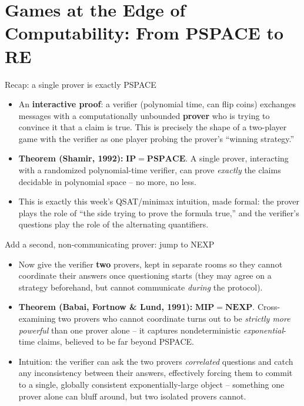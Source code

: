 \documentclass[11pt,aspectratio=169]{beamer}
\begin{document}
\section{Games at the Edge of Computability: From PSPACE to RE}

\begin{frame}{Recap: a single prover is exactly PSPACE}
  \begin{itemize}
    \item An \textbf{interactive proof}: a verifier (polynomial time, can flip coins)
    exchanges messages with a computationally unbounded \textbf{prover} who is trying
    to convince it that a claim is true. This is precisely the shape of a two-player
    game with the verifier as one player probing the prover's ``winning strategy.''
    \item \textbf{Theorem (Shamir, 1992):} $\mathbf{IP} = \mathbf{PSPACE}$. A single
    prover, interacting with a randomized polynomial-time verifier, can prove
    \emph{exactly} the claims decidable in polynomial space -- no more, no less.
    \item This is exactly this week's QSAT/minimax intuition, made formal: the
    prover plays the role of ``the side trying to prove the formula true,'' and the
    verifier's questions play the role of the alternating quantifiers.
  \end{itemize}
\end{frame}

\begin{frame}{Add a second, non-communicating prover: jump to NEXP}
  \begin{itemize}
    \item Now give the verifier \textbf{two} provers, kept in separate rooms so they
    cannot coordinate their answers once questioning starts (they may agree on a
    strategy beforehand, but cannot communicate \emph{during} the protocol).
    \item \textbf{Theorem (Babai, Fortnow \& Lund, 1991):} $\mathbf{MIP} =
    \mathbf{NEXP}$. Cross-examining two provers who cannot coordinate turns out to be
    \emph{strictly more powerful} than one prover alone -- it captures nondeterministic
    \emph{exponential}-time claims, believed to be far beyond PSPACE.
    \item Intuition: the verifier can ask the two provers \emph{correlated} questions
    and catch any inconsistency between their answers, effectively forcing them to
    commit to a single, globally consistent exponentially-large object -- something one
    prover alone can bluff around, but two isolated provers cannot.
  \end{itemize}
\end{frame}
\end{document}
